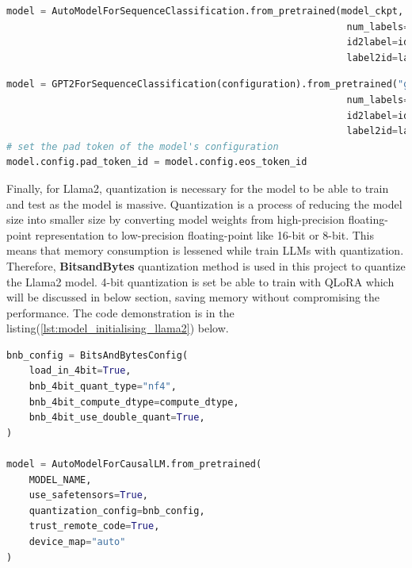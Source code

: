 \begin{lstlisting}[language=Python, caption=The code for initialising model for both MiniLM and RoBERTa, label=lst:model_initialising_mini_rob]
model = AutoModelForSequenceClassification.from_pretrained(model_ckpt,
                                                            num_labels=6,
                                                            id2label=id2label,
                                                            label2id=label2id)
\end{lstlisting}

\begin{lstlisting}[language=Python, caption=The code for initialising model for GPT-2, label=lst:model_initialising_gpt2]
model = GPT2ForSequenceClassification(configuration).from_pretrained("gpt2",
                                                            num_labels=6,
                                                            id2label=id2label,
                                                            label2id=label2id)
# set the pad token of the model's configuration
model.config.pad_token_id = model.config.eos_token_id
\end{lstlisting}

Finally, for Llama2, quantization is necessary for the model to be able to train and test as the model is massive. Quantization is a process of reducing the model size into smaller size by converting model weights from high-precision floating-point representation to low-precision floating-point like 16-bit or 8-bit\cite{Deci_2024}. This means that memory consumption is lessened while train LLMs with quantization. Therefore, \textbf{BitsandBytes} quantization method is used in this project to quantize the Llama2 model. 4-bit quantization is set be able to train with QLoRA which will be discussed in below section, saving memory without compromising the performance\cite{Dettmers}. The code demonstration is in the listing(\ref{lst:model_initialising_llama2}) below.

\begin{lstlisting}[language=Python, caption=The code for initialising model and BitsandBytes configuration for Llama2, label=lst:model_initialising_llama2]
bnb_config = BitsAndBytesConfig(
    load_in_4bit=True,
    bnb_4bit_quant_type="nf4",
    bnb_4bit_compute_dtype=compute_dtype,
    bnb_4bit_use_double_quant=True,
)

model = AutoModelForCausalLM.from_pretrained(
    MODEL_NAME,
    use_safetensors=True,
    quantization_config=bnb_config,
    trust_remote_code=True,
    device_map="auto"
)
\end{lstlisting}

